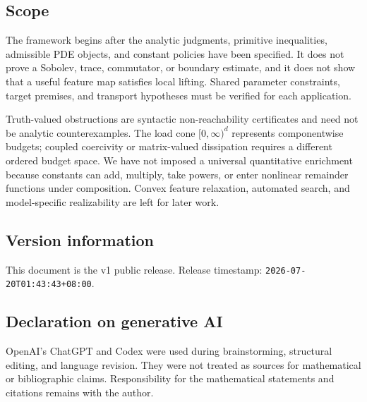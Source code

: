 \documentclass[10pt,journal,a4paper]{IEEEtran}
\theoremstyle{definition}
\begin{document}
\subsection{Scope}

The framework begins after the analytic judgments, primitive inequalities, admissible PDE objects, and constant policies have been specified. It does not prove a Sobolev, trace, commutator, or boundary estimate, and it does not show that a useful feature map satisfies local lifting. Shared parameter constraints, target premises, and transport hypotheses must be verified for each application.

Truth-valued obstructions are syntactic non-reachability certificates and need not be analytic counterexamples. The load cone $[0,\infty)^d$ represents componentwise budgets; coupled coercivity or matrix-valued dissipation requires a different ordered budget space. We have not imposed a universal quantitative enrichment because constants can add, multiply, take powers, or enter nonlinear remainder functions under composition. Convex feature relaxation, automated search, and model-specific realizability are left for later work.

\subsection*{Version information}

This document is the v1 public release. Release timestamp: \texttt{2026-07-20T01:43:43+08:00}.

\subsection*{Declaration on generative AI}

OpenAI's ChatGPT and Codex were used during brainstorming, structural editing, and language revision. They were not treated as sources for mathematical or bibliographic claims. Responsibility for the mathematical statements and citations remains with the author.
\end{document}
